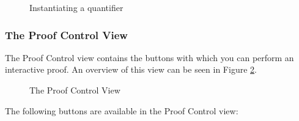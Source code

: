 \begin{figure}[!ht]
\begin{center}
	\caption{Instantiating a quantifier}
	\label{fig_ref_01_proving_perspective5}
\end{center}
\end{figure}

\subsubsection{The Proof Control View}
\label{proof_control_view}

The \textsf{Proof Control} view contains the buttons with which you can perform an interactive proof. An overview of this view can be seen in Figure \ref{fig_ref_01_proving_perspective6}.

\begin{figure}[!ht]
\begin{center}
	\caption{The Proof Control View}
	\label{fig_ref_01_proving_perspective6}
\end{center}
\end{figure}

The following buttons are available in the \textsf{Proof Control} view:

